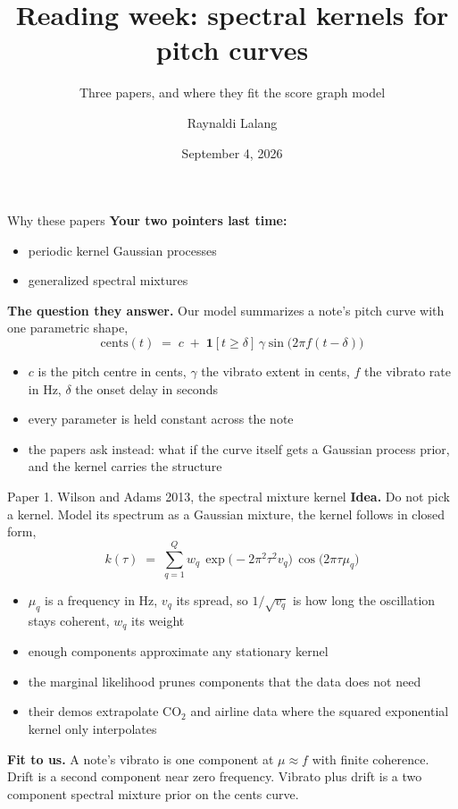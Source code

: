 \documentclass[aspectratio=169,11pt]{beamer}
\title{\textbf{Reading week: spectral kernels for pitch curves}}
\subtitle{Three papers, and where they fit the score graph model}
\author{Raynaldi Lalang}
\institute{Kyoto University}
\date{September 4, 2026}
\begin{document}
\begin{frame}
  \titlepage
\end{frame}

\begin{frame}{Why these papers}
  \textbf{Your two pointers last time:}
  \begin{itemize}
    \item periodic kernel Gaussian processes
    \item generalized spectral mixtures
  \end{itemize}
  \vspace{2mm}
  \textbf{The question they answer.} Our model summarizes a note's pitch
  curve with one parametric shape,
  \[
    \mathrm{cents}(t) \;=\; c \;+\;
    \mathbf{1}[t \ge \delta]\,\gamma \sin\!\bigl(2\pi f (t-\delta)\bigr)
  \]
  \begin{itemize}
    \item $c$ is the pitch centre in cents, $\gamma$ the vibrato extent
          in cents, $f$ the vibrato rate in Hz, $\delta$ the onset delay
          in seconds
    \item every parameter is held constant across the note
    \item the papers ask instead: what if the curve itself gets a
          Gaussian process prior, and the kernel carries the structure
  \end{itemize}
\end{frame}

\begin{frame}{Paper 1. Wilson and Adams 2013, the spectral mixture kernel}
  \textbf{Idea.} Do not pick a kernel. Model its spectrum as a Gaussian
  mixture, the kernel follows in closed form,
  \[
    k(\tau) \;=\; \sum_{q=1}^{Q} w_q\,
      \exp\!\bigl(-2\pi^2 \tau^2 v_q\bigr)\,
      \cos\!\bigl(2\pi \tau \mu_q\bigr)
  \]
  \begin{itemize}
    \item $\mu_q$ is a frequency in Hz, $v_q$ its spread, so
          $1/\sqrt{v_q}$ is how long the oscillation stays coherent,
          $w_q$ its weight
    \item enough components approximate any stationary kernel
    \item the marginal likelihood prunes components that the data does
          not need
    \item their demos extrapolate CO$_2$ and airline data where the
          squared exponential kernel only interpolates
  \end{itemize}
  \vspace{1mm}
  \textbf{Fit to us.} A note's vibrato is one component at $\mu \approx f$
  with finite coherence. Drift is a second component near zero frequency.
  Vibrato plus drift is a two component spectral mixture prior on the
  cents curve.
\end{frame}
\end{document}
